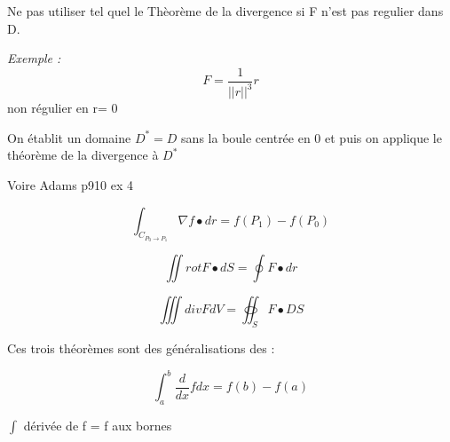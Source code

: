 \begin{myrem}
Ne pas utiliser tel quel le Thèorème de la divergence si F n'est pas regulier dans D.


\emph{Exemple :} \[F = \dfrac{1}{||r||^3} r \] non régulier en r= 0

On établit un domaine $ D^* =D $ sans la boule centrée en 0 et puis on applique le théorème de la divergence à $D^*$

Voire Adams p910 ex 4
\end{myrem}

\begin{myrem}
\[\int_{C_{P_0 \to P_1}} \nabla f \bullet dr = f(P_1) - f(P_0) \]

\[\iint rot F \bullet dS = \oint F \bullet dr \]

\[\iiint div F dV = \oiint_S F \bullet DS\]

Ces trois théorèmes sont des généralisations des :


\[\int_a^b \frac{d}{dx}f dx = f(b) - f(a) \]

$\int$ dérivée de f = f aux bornes
\end{myrem}
